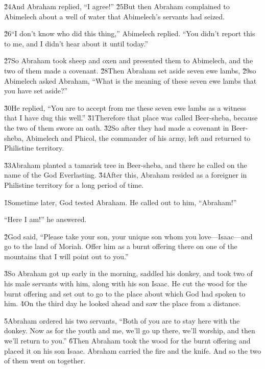 \v{24}And Abraham replied, ``I agree!'' \v{25}But then Abraham complained to Abimelech about a well of water that Abimelech's servants had seized.

\v{26}``I don't know who did this thing,'' Abimelech replied. ``You didn't report this to me, and I didn't hear about it until today.''

\v{27}So Abraham took sheep and oxen and presented them to Abimelech, and the two of them made a covenant. \v{28}Then Abraham set aside seven ewe lambs, \v{29}so Abimelech asked Abraham, ``What is the meaning of these seven ewe lambs that you have set aside?''

\v{30}He replied, ``You are to accept from me these seven ewe lambs as a witness that I have dug this well.'' \v{31}Therefore that place was called Beer-sheba, because the two of them swore an oath. \v{32}So after they had made a covenant in Beer-sheba, Abimelech and Phicol, the commander of his army, left and returned to Philistine territory.

\v{33}Abraham planted a tamarisk tree in Beer-sheba, and there he called on the name of the  God Everlasting. \v{34}After this, Abraham resided as a foreigner in Philistine territory for a long period of time.

\v{1}Sometime later, God tested Abraham. He called out to him, ``Abraham!''

``Here I am!'' he answered.

\v{2}God said, ``Please take your son, your unique son whom you love---Isaac---and go to the land of Moriah. Offer him as a burnt offering there on one of the mountains that I will point out to you.''

\v{3}So Abraham got up early in the morning, saddled his donkey, and took two of his male servants with him, along with his son Isaac. He cut the wood for the burnt offering and set out to go to the place about which God had spoken to him. \v{4}On the third day he looked ahead and saw the place from a distance.

\v{5}Abraham ordered his two servants, ``Both of you are to stay here with the donkey. Now as for the youth and me, we'll go up there, we'll worship, and then we'll return to you.'' \v{6}Then Abraham took the wood for the burnt offering and placed it on his son Isaac. Abraham carried the fire and the knife. And so the two of them went on together.

